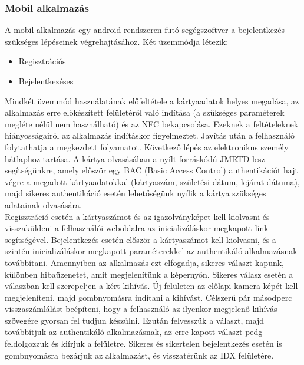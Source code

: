 \subsubsection{Mobil alkalmazás}
A mobil alkalmazás egy android rendszeren futó segégszoftver a bejelentkezés szükséges lépéseinek végrehajtásához. Két üzemmódja létezik:
\begin{itemize}
\item Regisztrációs
\item Bejelentkezéses
\end{itemize}

Mindkét üzemmód használatának előfeltétele a kártyaadatok helyes megadása, az alkalmazás erre előkészített felületéről való indítása (a szükséges paraméterek megléte nélül nem használható) és az NFC bekapcsolása. Ezeknek a feltételeknek hiányosságairól az alkalmazás indításkor figyelmeztet. Javítás után a felhasználó folytathatja a megkezdett folyamatot. Következő lépés az elektronikus személy hátlaphoz tartása. A kártya olvasásában a nyílt forráskódú JMRTD lesz segítségünkre, amely először egy BAC (Basic Access Control) authentikációt hajt végre a megadott kártyaadatokkal (kártyaszám, születési dátum, lejárat dátuma), majd sikeres authentikáció esetén lehetőségünk nyílik a kártya szükséges adatainak olvasására.
\\Regisztráció esetén a kártyaszámot és az igazolványképet kell kiolvasni és visszaküldeni a felhasználói weboldalra az inicializáláskor megkapott link segítségével.
Bejelentkezés esetén először a kártyaszámot kell kiolvasni, és a szintén inicializáláskor megkapott paraméterekkel az authentikáló alkalmazásnak továbbítani. Amennyiben az alkalmazás ezt elfogadja, sikeres választ kapunk, különben hibaüzenetet, amit megjelenítünk a képernyőn. Sikeres válasz esetén a válaszban kell szerepeljen a kért kihívás. Új felületen az előlapi kamera képét kell megjeleníteni, majd gombnyomásra indítani a kihívást. Célszerű pár másodperc visszaszámlálást beépíteni, hogy a felhasználó az ilyenkor megjelenő kihívás szövegére gyorsan fel tudjun készülni. Ezután felvesszük a választ, majd továbbítjuk az authentikáló alkalmazásnak, az erre kapott választ pedg feldolgozzuk és kiírjuk a felületre. Sikeres és sikertelen bejelentkezés esetén is gombnyomásra bezárjuk az alkalmazást, és visszatérünk az IDX felületére.



